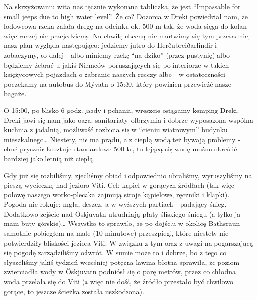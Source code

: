 
Na skrzyżowaniu wita nas ręcznie wykonana tabliczka, że  jest “Impassable for small jeeps due to high water level”. Że co? Dozorca w Dreki powiedział nam, że lodowcowa rzeka zalała drogę na odcinku ok. 500 m tak, że woda sięga do kolan - więc raczej nie przejedziemy. Na chwilę obecną nie martwimy się tym przesadnie, nasz plan wygląda następująco: jedziemy jutro do Herðubreiðarlindir i zobaczymy, co dalej - albo miniemy rzekę “na dziko” (przez pustynię) albo będziemy żebrać u jakiś Niemców poruszających się po interiorze w takich księżycowych pojazdach o zabranie naszych rzeczy albo - w ostateczności - poczekamy na autobus do Mývatn o 15:30, który powinien przewieźć nasze bagaże.

O 15:00, po blisko 6 godz. jazdy i pchania, wreszcie osiągamy kemping Dreki. Dreki jawi się nam jako oaza: sanitariaty, olbrzymia i dobrze wyposażona wspólna kuchnia z jadalnią, możliwość rozbicia się w “cieniu wiatrowym” budynku mieszkalnego… Niestety, nie ma prądu, a z ciepłą wodą też bywają problemy - choć prysznic kosztuje standardowe 500 kr, to lejącą się wodę można określić bardziej jako letnią niż ciepłą.

Gdy już się rozbiliśmy, zjedliśmy obiad i odpowiednio ubraliśmy, wyruszyliśmy na pieszą wycieczkę nad jezioro Viti. Cel: kąpiel w gorących źródłach (tak więc połowę naszego worko-plecaka zajmują stroje kąpielowe, ręczniki i klapki). Pogoda nie rokuje: mgła, deszcz, a w wyższych partiach - padający śnieg. Dodatkowo zejście nad Öskjuvatn utrudniają płaty śliskiego śniegu (a tylko ja mam buty górskie)… Wszystko to sprawiło, że po dojściu w okolicę Bathsraun samotnie pobiegłem na małe (10-minutowe) przeszpiegi, które niestety nie potwierdziły bliskości jeziora Viti. W związku z tym oraz z uwagi na pogarszającą się pogodę zarządziliśmy odwrót. W sumie może to i dobrze, bo z tego co słyszeliśmy jakiś tydzień wcześniej potężna lawina błotna sprawiła, że poziom zwierciadła wody w Öskjuvatn podniósł się o parę metrów, przez co chłodna woda przelała się do Viti (a więc nie dość, że źródło przestało być chwilowo gorące, to jeszcze ścieżka została uszkodzona).


